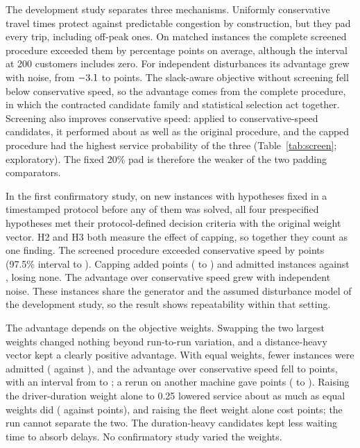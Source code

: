 \documentclass[11pt,a4paper]{article}
\begin{document}
The development study separates three mechanisms. Uniformly conservative travel
times protect against predictable congestion by construction, but they pad every
trip, including off-peak ones. On matched instances the complete screened
procedure exceeded them by \ProcConsRange{} percentage points on average,
although the interval at 200 customers includes zero. For independent
disturbances its advantage grew with noise, from $-3.1$ to
\SweepHighIndep{} points. The slack-aware objective without screening fell below
conservative speed, so the advantage comes from the complete procedure, in
which the contracted candidate family and statistical selection act together.
Screening also improves conservative speed: applied to conservative-speed
candidates, it performed about as well as the original procedure, and the capped
procedure had the highest service probability of the three
(Table~\ref{tab:screen}; exploratory). The fixed 20\% pad is therefore the weaker
of the two padding comparators.

In the first confirmatory study, on \ConfInstances{} new instances with
hypotheses fixed in a timestamped protocol before any of them was solved, all
four prespecified hypotheses met their protocol-defined decision criteria with the
original weight vector. H2 and H3 both measure the effect of capping, so
together they count as one finding. The screened procedure
exceeded conservative speed by \ConfHOneMean{} points (97.5\% interval
\ConfHOneLo{} to \ConfHOneHi{}). Capping added \ConfHTwoMean{} points
(\ConfHTwoLo{} to \ConfHTwoHi{}) and admitted \ConfHThreeK{} instances against
\ConfHThreeP{}, losing none. The advantage over conservative speed grew with
independent noise. These instances share the generator and the assumed
disturbance model of the development study, so the result shows repeatability
within that setting.

The advantage depends on the objective weights. Swapping the two largest weights
changed nothing beyond run-to-run variation, and a distance-heavy vector kept a
clearly positive advantage. With equal weights, fewer instances were admitted
(\WtEqualAdmitted{} against \WtBaseAdmitted{}), and the advantage over
conservative speed fell to \WtEqualPCMean{} points, with an interval from
\WtEqualPCLo{} to \WtEqualPCHi{}; a rerun on another machine gave
\BrEqAdv{} points (\BrEqAdvLo{} to \BrEqAdvHi{}). Raising the driver-duration
weight alone to 0.25 lowered service about as much as equal weights did
(\BrDurDiff{} against \BrEqDiff{} points), and raising the fleet weight alone
cost \BrFleetDiff{} points; the run cannot separate the two. The duration-heavy
candidates kept less waiting time to absorb delays. No confirmatory study varied the weights.
\end{document}
